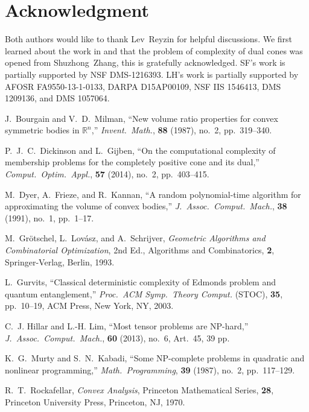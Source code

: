 \documentclass[11pt,reqno]{amsart}
\theoremstyle{definition}
\theoremstyle{remark}
\begin{document}
\section*{Acknowledgment}

Both authors would like to thank Lev~Reyzin for helpful discussions. We first learned about  the work in \cite{DG14} and that the problem of complexity of dual cones  was opened from Shuzhong~Zhang, this is gratefully acknowledged.
SF's work is partially supported by NSF DMS-1216393.  
LH's work is partially supported by AFOSR FA9550-13-1-0133, DARPA D15AP00109, NSF IIS 1546413, DMS 1209136, and DMS 1057064.


\begin{thebibliography}{1}
 J.~Bourgain and V.~D.~Milman, ``New volume ratio properties for convex symmetric bodies in $\mathbb{R}^n$,'' \emph{Invent.\ Math.}, \textbf{88} (1987), no.~2, pp.~319--340.

 P.~J.~C.~Dickinson and L.~Gijben, ``On the computational complexity of membership problems for the completely positive cone and its dual,'' \emph{Comput.\ Optim.\ Appl.}, \textbf{57} (2014), no.~2, pp.~403--415.

 M.~Dyer, A.~Frieze, and R.~Kannan, ``A random polynomial-time algorithm for approximating the volume of convex bodies,'' \emph{J.\ Assoc.\ Comput.\ Mach.}, \textbf{38} (1991), no.~1, pp.~1--17. 

 M.~Gr\"{o}tschel, L.~Lov\'{a}sz, and A.~Schrijver, \emph{Geometric Algorithms and Combinatorial Optimization}, 2nd Ed., Algorithms and Combinatorics, \textbf{2}, Springer-Verlag, Berlin, 1993.

  L.~Gurvits, ``Classical deterministic complexity of Edmonds problem and quantum entanglement,'' \emph{Proc.\ ACM Symp.\ Theory Comput.} (STOC), \textbf{35}, pp.~10--19, ACM Press,  New York, NY, 2003.

 C.~J. Hillar and L.-H. Lim, ``Most tensor problems are NP-hard,''  \emph{J.\ Assoc.\ Comput.\ Mach.}, \textbf{60} (2013), no.~6, Art.~45, 39 pp.

K.~G.~Murty and S.~N.~Kabadi, ``Some NP-complete problems in quadratic and nonlinear programming,'' \emph{Math.\ Programming}, \textbf{39} (1987), no.~2, pp.~117--129.

  R.~T.~Rockafellar, \emph{Convex Analysis},  Princeton Mathematical Series, \textbf{28}, Princeton University Press, Princeton, NJ, 1970.

 \end{thebibliography}
\end{document}
